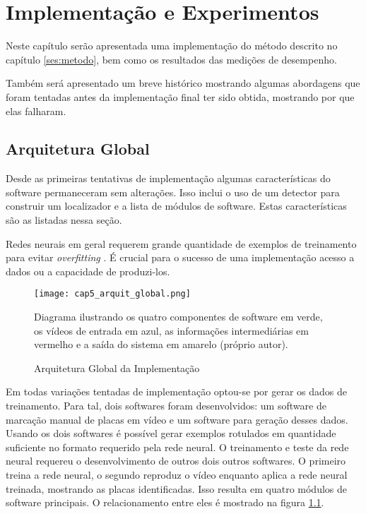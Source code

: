 
\chapter{Implementação e Experimentos}

Neste capítulo serão apresentada uma implementação do método descrito
no capítulo \ref{ses:metodo}, bem como os resultados das medições de
desempenho.

Também será apresentado um breve histórico mostrando algumas abordagens que
foram tentadas antes da implementação final ter sido obtida, mostrando por que
elas falharam.

\section{Arquitetura Global}
Desde as primeiras tentativas de implementação algumas características do
software permaneceram sem alterações. Isso inclui o uso de um detector para
construir um localizador e a lista de módulos de software. Estas
características são as listadas nessa seção.

Redes neurais em geral requerem grande quantidade de exemplos de treinamento
para evitar \emph{overfitting} \cite{hawkins2004problem}. É crucial para o
sucesso de uma implementação acesso a dados ou a capacidade de produzi-los.

\begin{figure}[!htb]
	\centering
	\texttt{[image: cap5\_arquit\_global.png]}
	\caption{Arquitetura Global da Implementação}
	\label{fig:cap5_arquit_global}
	Diagrama ilustrando os quatro componentes de software em verde, os vídeos
	de entrada em azul, as informações intermediárias em vermelho e a saída do
	sistema em amarelo (próprio autor).
\end{figure}

Em todas variações tentadas de implementação optou-se por gerar os dados de
treinamento. Para tal, dois softwares foram desenvolvidos: um software de
marcação manual de placas em vídeo e um software para geração desses dados.
Usando os dois softwares é possível gerar exemplos rotulados em quantidade
suficiente no formato requerido pela rede neural. O treinamento e teste da rede
neural requereu o desenvolvimento de outros dois outros softwares. O primeiro
treina a rede neural, o segundo reproduz o vídeo enquanto aplica a rede neural
treinada, mostrando as placas identificadas. Isso resulta em quatro módulos de
software principais. O relacionamento entre eles é mostrado na figura
\ref{fig:cap5_arquit_global}.

